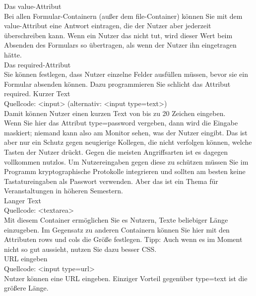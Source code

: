 Das value-Attribut\\

Bei allen Formular-Containern (außer dem file-Container) können Sie mit dem value-Attribut eine Antwort eintragen, die der Nutzer aber jederzeit überschreiben kann. Wenn ein Nutzer das nicht tut, wird dieser Wert beim Absenden des Formulars so übertragen, als wenn der Nutzer ihn eingetragen hätte.\\

Das required-Attribut\\

Sie können festlegen, dass Nutzer einzelne Felder ausfüllen müssen, bevor sie ein Formular absenden können. Dazu programmieren Sie schlicht das Attribut required.
Kurzer Text\\

Quellcode: <input> (alternativ: <input type=text>)\\

Damit können Nutzer einen kurzen Text von bis zu 20 Zeichen eingeben.\\

Wenn Sie hier das Attribut type=password vergeben, dann wird die Eingabe maskiert; niemand kann also am Monitor sehen, was der Nutzer eingibt. Das ist aber nur ein Schutz gegen neugierige Kollegen, die nicht verfolgen können, welche Tasten der Nutzer drückt. Gegen die meisten Angriffsarten ist es dagegen vollkommen nutzlos. Um Nutzereingaben gegen diese zu schützen müssen Sie im Programm kryptographische Protokolle integrieren und sollten am besten keine Tastatureingaben als Passwort verwenden. Aber das ist ein Thema für Veranstaltungen in höheren Semestern.\\

Langer Text\\

Quellcode: <textarea>\\

Mit diesem Container ermöglichen Sie es Nutzern, Texte beliebiger Länge einzugeben. Im Gegensatz zu anderen Containern können Sie hier mit den Attributen rows und cols die Größe festlegen. Tipp: Auch wenn es im Moment nicht so gut aussieht, nutzen Sie dazu besser CSS.\\

URL eingeben\\

Quellcode: <input type=url>\\

Nutzer können eine URL eingeben. Einziger Vorteil gegenüber type=text ist die größere Länge.\\

